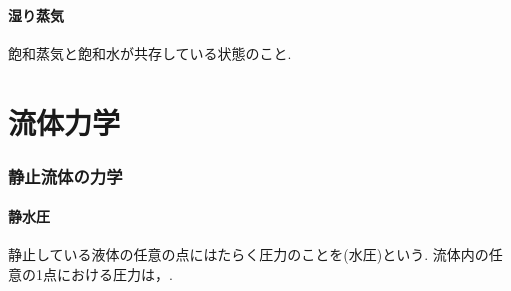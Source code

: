 \documentclass[a4paper]{jsarticle}
\begin{document}
\subsection{湿り蒸気}
飽和蒸気と飽和水が共存している状態のこと.

\part{流体力学}
\section{静止流体の力学}
\subsection{静水圧}
静止している液体の任意の点にはたらく圧力のことを(水圧)という.
流体内の任意の1点における圧力は，.
\end{document}
